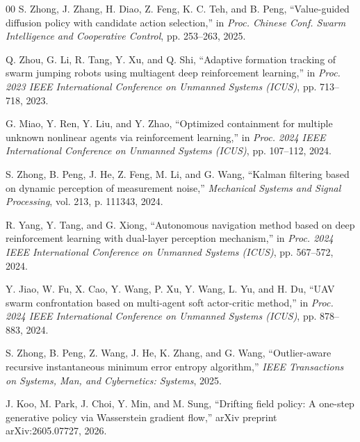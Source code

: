 \documentclass[conference]{IEEEtran}
\begin{document}
\begin{thebibliography}{00}
S. Zhong, J. Zhang, H. Diao, Z. Feng, K. C. Teh, and B. Peng, 
``Value-guided diffusion policy with candidate action selection,'' 
in \emph{Proc. Chinese Conf. Swarm Intelligence and Cooperative Control}, 
pp. 253--263, 2025.

Q. Zhou, G. Li, R. Tang, Y. Xu, and Q. Shi,
``Adaptive formation tracking of swarm jumping robots using multiagent deep reinforcement learning,''
in \emph{Proc. 2023 IEEE International Conference on Unmanned Systems (ICUS)},
pp. 713--718, 2023.

G. Miao, Y. Ren, Y. Liu, and Y. Zhao,
``Optimized containment for multiple unknown nonlinear agents via reinforcement learning,''
in \emph{Proc. 2024 IEEE International Conference on Unmanned Systems (ICUS)},
pp. 107--112, 2024.

S. Zhong, B. Peng, J. He, Z. Feng, M. Li, and G. Wang, 
``Kalman filtering based on dynamic perception of measurement noise,'' 
\emph{Mechanical Systems and Signal Processing}, 
vol. 213, p. 111343, 2024.

R. Yang, Y. Tang, and G. Xiong,
``Autonomous navigation method based on deep reinforcement learning with dual-layer perception mechanism,''
in \emph{Proc. 2024 IEEE International Conference on Unmanned Systems (ICUS)},
pp. 567--572, 2024.

Y. Jiao, W. Fu, X. Cao, Y. Wang, P. Xu, Y. Wang, L. Yu, and H. Du,
``UAV swarm confrontation based on multi-agent soft actor-critic method,''
in \emph{Proc. 2024 IEEE International Conference on Unmanned Systems (ICUS)},
pp. 878--883, 2024.

S. Zhong, B. Peng, Z. Wang, J. He, K. Zhang, and G. Wang, 
``Outlier-aware recursive instantaneous minimum error entropy algorithm,'' 
\emph{IEEE Transactions on Systems, Man, and Cybernetics: Systems}, 
2025.

J. Koo, M. Park, J. Choi, Y. Min, and M. Sung,
``Drifting field policy: A one-step generative policy via Wasserstein gradient flow,''
arXiv preprint arXiv:2605.07727, 2026.

\end{thebibliography}
\end{document}
